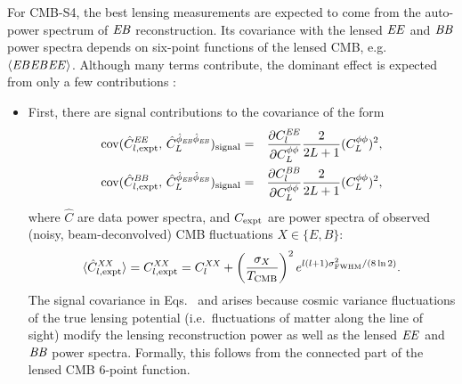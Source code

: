 For CMB-S4, the best lensing measurements are expected to come from the auto-power spectrum of $\mathit{EB}$ reconstruction.  Its covariance with the lensed $\mathit{EE}$ and $\mathit{BB}$ power spectra depends on six-point functions of the lensed CMB, e.g.~$\langle \mathit{EB}\mathit{EB}\mathit{EE} \rangle$. Although many terms contribute, the dominant effect is expected from only a few contributions \cite{marcel1308}:  

\begin{itemize}
\item First, there are signal contributions to the covariance of the form
\begin{eqnarray}
  \label{eq:covEEphiEBphiEB}
  \mathrm{cov}(\hat C^{\mathit{EE}}_{l,\mathrm{expt}},\, 
  \hat{C}^{\hat\phi_{\mathit{EB}}\hat\phi_{\mathit{EB}}}_{L})_\mathrm{signal}
&=&
\frac{\partial C^{\mathit{EE}}_l}{\partial C^{\phi\phi}_{L}}
\frac{2}{2L+1} (C^{\phi\phi}_{L})^2,\\
  \label{eq:covBBphiEBphiEB}
  \mathrm{cov}(\hat C^{\mathit{BB}}_{l,\mathrm{expt}},\, 
  \hat{C}^{\hat\phi_{\mathit{EB}}\hat\phi_{\mathit{EB}}}_{L})_\mathrm{signal}
&=&
\frac{\partial C^{\mathit{BB}}_l}{\partial C^{\phi\phi}_{L}}
\frac{2}{2L+1} (C^{\phi\phi}_{L})^2,
\end{eqnarray}
where $\hat C$ are data power spectra, and $C_{\mathrm{expt}}$ are power spectra of observed (noisy, beam-deconvolved) CMB fluctuations $X\in \{E,B\}$:
\begin{equation}
  \label{eq:CXXexptExpectation}
  \langle\hat C^{\mathit{XX}}_{l,\mathrm{expt}}\rangle = 
 C^{\mathit{XX}}_{l,\mathrm{expt}} = C^{\mathit{XX}}_{l}
+ \left(\frac{\sigma_X}{T_\mathrm{CMB}}\right)^2 
  e^{l(l+1)\sigma^2_{\mathrm{FWHM}}/(8\ln 2)}.
\end{equation}
The signal covariance in Eqs.~ and  arises because cosmic variance fluctuations of the true lensing potential (i.e.~fluctuations of matter along the line of sight) modify the lensing reconstruction power as well as the lensed $\mathit{EE}$ and $\mathit{BB}$ power spectra.  Formally, this follows from the connected part of the lensed CMB 6-point function.


\end{itemize}
